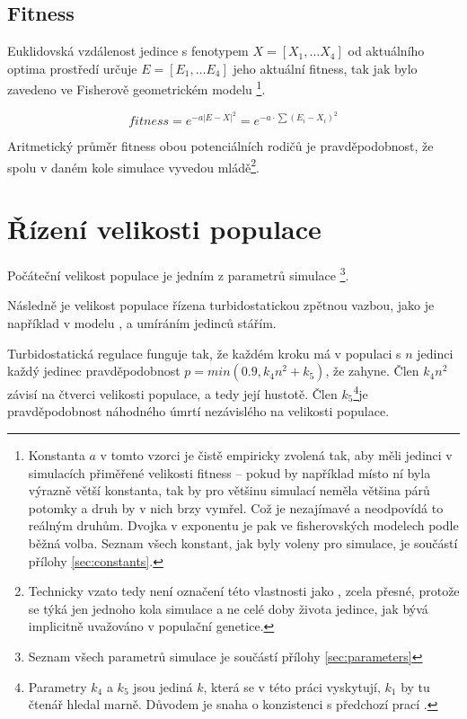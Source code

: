 \subsection{Fitness}

Euklidovská vzdálenost jedince s fenotypem $X = [X_1,\dots{}X_4]$ od aktuálního optima prostředí určuje
$E = [E_1,\dots{} E_4]$ jeho aktuální fitness, tak jak bylo zavedeno ve Fisherově geometrickém modelu
\citep{tenaillon2014utility}\footnote{
Konstanta $a$ v tomto vzorci je čistě empiricky zvolená tak, aby měli jedinci v simulacích
přiměřené velikosti fitness -- pokud by například místo ní byla výrazně větší konstanta, tak by pro většinu simulací
neměla většina párů potomky a druh by v nich brzy vymřel. Což je nezajímavé a neodpovídá to reálným druhům.
Dvojka v exponentu je pak ve fisherovských modelech podle \citet{tenaillon2014utility} běžná volba.
Seznam všech konstant, jak byly voleny pro simulace, je součástí přílohy \ref{sec:constants}.
}.

\begin{equation}
fitness = e^{-a |E-X|^2} = e^{-a\cdot{\sum{(E_i - X_i)^2}}}
\end{equation}

Aritmetický průměr fitness obou potenciálních rodičů je pravděpodobnost, že spolu v daném kole simulace vyvedou
mládě\footnote{Technicky vzato tedy není označení této vlastnosti jako , zcela přesné, protože se týká
jen jednoho kola simulace a ne celé doby života jedince, jak bývá implicitně uvažováno v populační genetice.}.

\section{Řízení velikosti populace}

Počáteční velikost populace je jedním z parametrů simulace
\footnote{Seznam všech parametrů simulace je součástí přílohy \ref{sec:parameters}}.

Následně je velikost populace řízena turbidostatickou
zpětnou vazbou, jako je například v modelu \citet{Flegr139030}, a umíráním jedinců stářím.

Turbidostatická regulace funguje tak, že každém kroku má v populaci s $n$ jedinci každý jedinec pravděpodobnost
$p = min(0.9, k_4 n^2 + k_5)$, že zahyne. Člen $k_4 n^2$ závisí na čtverci velikosti populace, a tedy její hustotě.
Člen $k_5$\footnote{
Parametry $k_4$ a $k_5$ jsou jediná $k$, která se v této práci vyskytují, $k_1$ by tu čtenář hledal marně. Důvodem je
snaha o konzistenci s předchozí prací \citet{Flegr139030}.
}je pravděpodobnost náhodného úmrtí nezávislého na velikosti populace.

